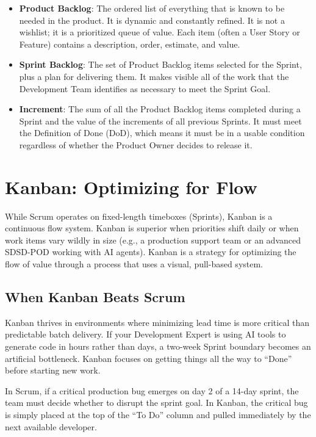 \begin{itemize}
\tightlist
\item
  \textbf{Product Backlog}: The ordered list of everything that is known
  to be needed in the product. It is dynamic and constantly refined. It
  is not a wishlist; it is a prioritized queue of value. Each item
  (often a User Story or Feature) contains a description, order,
  estimate, and value.
\item
  \textbf{Sprint Backlog}: The set of Product Backlog items selected for
  the Sprint, plus a plan for delivering them. It makes visible all of
  the work that the Development Team identifies as necessary to meet the
  Sprint Goal.
\item
  \textbf{Increment}: The sum of all the Product Backlog items completed
  during a Sprint and the value of the increments of all previous
  Sprints. It must meet the Definition of Done (DoD), which means it
  must be in a usable condition regardless of whether the Product Owner
  decides to release it.
\end{itemize}

\section{Kanban: Optimizing for Flow}\label{kanban-optimizing-for-flow}

While Scrum operates on fixed-length timeboxes (Sprints), Kanban is a
continuous flow system. Kanban is superior when priorities shift daily
or when work items vary wildly in size (e.g., a production support team
or an advanced SDSD-POD working with AI agents). Kanban is a strategy
for optimizing the flow of value through a process that uses a visual,
pull-based system.

\subsection{When Kanban Beats Scrum}\label{when-kanban-beats-scrum}

Kanban thrives in environments where minimizing lead time is more
critical than predictable batch delivery. If your Development Expert is
using AI tools to generate code in hours rather than days, a two-week
Sprint boundary becomes an artificial bottleneck. Kanban focuses on
getting things all the way to ``Done'' before starting new work.

In Scrum, if a critical production bug emerges on day 2 of a 14-day
sprint, the team must decide whether to disrupt the sprint goal. In
Kanban, the critical bug is simply placed at the top of the ``To Do''
column and pulled immediately by the next available developer.

